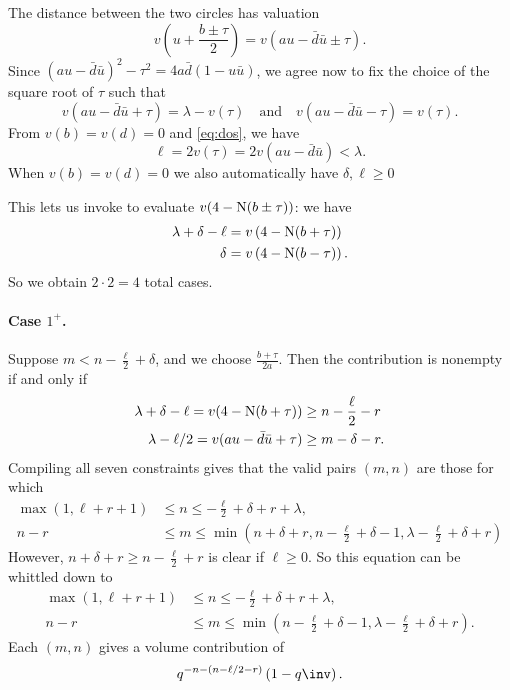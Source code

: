 The distance between the two circles has valuation
\[
  v\left( u + \frac{b \pm \tau}{2} \right)
  = v(au - \bar d \bar u \pm \tau).
\]
Since $(au-\bar d \bar u)^2 - \tau^2 = 4a\bar d(1- u\bar u)$,
we agree now to fix the choice of the square root of $\tau$ such that
\begin{equation}
  v(au-\bar d \bar u + \tau) = \lambda - v(\tau) \quad\text{and}\quad
  v(au-\bar d \bar u - \tau) = v(\tau).
  \label{eq:tau_choice}
\end{equation}
From $v(b) = v(d) = 0$ and \eqref{eq:dos}, we have
\[ \ell = 2v(\tau) = 2v(au - \bar d \bar u) < \lambda. \]
When $v(b) = v(d) = 0$ we also automatically have $\delta, \ell \ge 0$

This lets us invoke \cite[Lemma 4.7]{ref:AFL} to evaluate $v(4-\operatorname{N}(b \pm \tau))$:
we have
\begin{align*}
  \lambda + \delta - \ell &= v\left( 4 - \operatorname{N}(b+\tau) \right) \\
  \delta &= v\left( 4 - \operatorname{N}(b-\tau) \right).
\end{align*}
So we obtain $2 \cdot 2 = 4$ total cases.

\paragraph{Case $1^+$.}
Suppose $m < n - \frac{\ell}{2} + \delta$, and we choose $\frac{b+\tau}{2a}$.
Then the contribution is nonempty if and only if
\begin{align*}
  \lambda + \delta - \ell = v(4-\operatorname{N}(b+\tau)) &\geq n - \frac{\ell}{2} - r \\
  \lambda - \ell/2 = v(au-\bar d \bar u + \tau) & \geq m - \delta - r.
\end{align*}
Compiling all seven constraints gives that the valid pairs $(m,n)$ are those for which
\begin{align*}
  \max(1, \ell+r+1) &\leq n \leq -\frac{\ell}{2} + \delta + r + \lambda, \\
  n-r &\leq m \leq \min\left( n+\delta+r, n - \frac{\ell}{2}+\delta - 1,
    \lambda-\frac{\ell}{2}+\delta+r \right)
\end{align*}
However, $n + \delta + r \ge n - \frac{\ell}{2} + r$ is clear if $\ell \ge 0$.
So this equation can be whittled down to
\begin{equation}
  \begin{aligned}
    \max(1, \ell+r+1) &\leq n \leq  -\frac{\ell}{2} + \delta + r + \lambda, \\
    n-r &\leq m \leq \min\left( n - \frac{\ell}{2}+\delta - 1,
      \lambda-\frac{\ell}{2}+\delta+r \right).
  \end{aligned}
  \label{eq:even_case1_plus}
\end{equation}
Each $(m,n)$ gives a volume contribution of
\[ q^{-n - (n - \ell/2 - r)} \left( 1 - q\inv \right). \]


